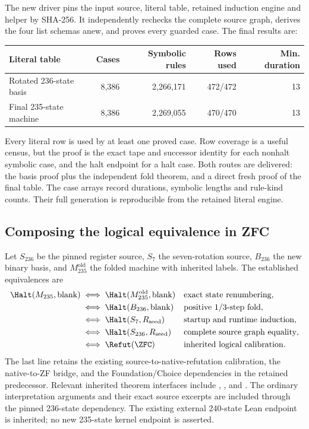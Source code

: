 The new driver pins the input source, literal table, retained induction
engine and helper by SHA-256. It independently rechecks the complete
source graph, derives the four list schemas anew, and proves every guarded
case. The final results are:
\begin{center}
\begin{tabular}{lrrrr}
\toprule
Literal table & Cases & Symbolic rules & Rows used & Min. duration\\
\midrule
Rotated 236-state basis &8,386&2,266,171&472/472&13\\
Final 235-state machine &8,386&2,269,055&470/470&13\\
\bottomrule
\end{tabular}
\end{center}
Every literal row is used by at least one proved case. Row coverage is a
useful census, but the proof is the exact tape and successor identity for
each nonhalt symbolic case, and the halt endpoint for a halt case.
Both routes are delivered: the basis proof plus the
independent fold theorem, and a direct fresh proof of the final table.
The case arrays record durations, symbolic lengths and rule-kind counts.
Their full generation is reproducible from the retained literal engine.

\subsection{Composing the logical equivalence in ZFC}

Let $S_{236}$ be the pinned register source, $S_7$ the seven-rotation
source, $B_{236}$ the new binary basis, and $M_{235}^{\mathrm{old}}$ the
folded machine with inherited labels. The established equivalences are
\begin{align*}
 \Halt(M_{235},\mathrm{blank})
 &\iff \Halt(M_{235}^{\mathrm{old}},\mathrm{blank})
       &&\text{exact state renumbering},\\
 &\iff \Halt(B_{236},\mathrm{blank})
       &&\text{positive 1/3-step fold},\\
 &\iff \Halt(S_7,R_{\mathrm{seed}})
       &&\text{startup and runtime induction},\\
 &\iff \Halt(S_{236},R_{\mathrm{seed}})
       &&\text{complete source graph equality},\\
 &\iff \Refut(\ZFC)
       &&\text{inherited logical calibration}.
\end{align*}
The last line retains the existing source-to-native-refutation calibration,
the native-to-ZF bridge, and the Foundation/Choice dependencies in the
retained predecessor. Relevant inherited theorem interfaces include
,
, and
.
The ordinary interpretation arguments and their exact source excerpts
are included through the pinned 236-state dependency. The existing
external 240-state Lean endpoint is inherited; no new 235-state kernel
endpoint is asserted.

